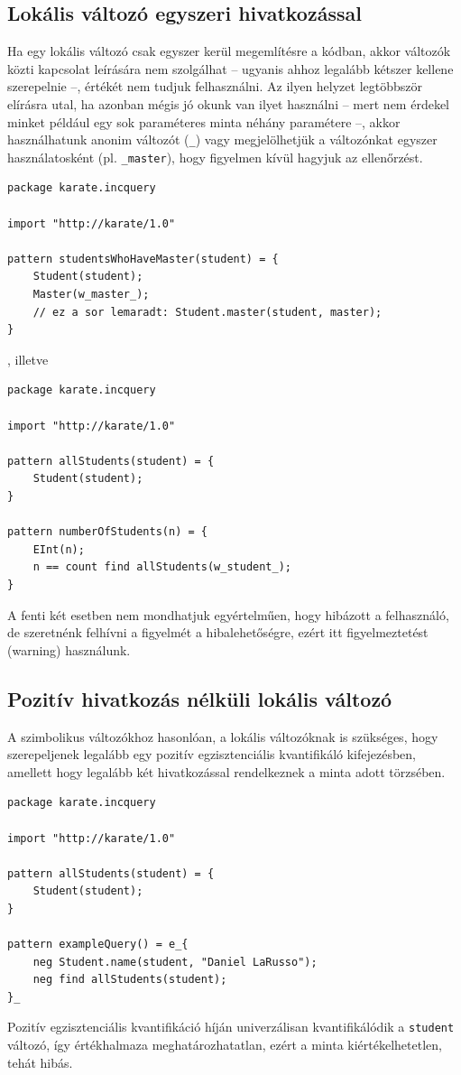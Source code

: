 \subsection{Lokális változó egyszeri hivatkozással}

Ha egy lokális változó csak egyszer kerül megemlítésre a kódban, akkor változók közti kapcsolat leírására nem szolgálhat -- ugyanis ahhoz legalább kétszer kellene szerepelnie --, értékét nem tudjuk felhasználni. Az ilyen helyzet legtöbbször elírásra utal, ha azonban mégis jó okunk van ilyet használni -- mert nem érdekel minket például egy sok paraméteres minta néhány paramétere --, akkor használhatunk anonim változót (\texttt{\_}) vagy megjelölhetjük a változónkat egyszer használatosként (pl. \texttt{\_master}), hogy figyelmen kívül hagyjuk az ellenőrzést.

\begin{lstlisting}
package karate.incquery

import "http://karate/1.0"

pattern studentsWhoHaveMaster(student) = {
    Student(student);
    Master(w_master_);
    // ez a sor lemaradt: Student.master(student, master);
}
\end{lstlisting}
%
%
, illetve
%
\begin{lstlisting}
package karate.incquery

import "http://karate/1.0"

pattern allStudents(student) = {
    Student(student);
}

pattern numberOfStudents(n) = {
    EInt(n);
    n == count find allStudents(w_student_);
}
\end{lstlisting}
%
%
A fenti két esetben nem mondhatjuk egyértelműen, hogy hibázott a felhasználó, de szeretnénk felhívni a figyelmét a hibalehetőségre, ezért itt figyelmeztetést (warning) használunk.

\subsection{Pozitív hivatkozás nélküli lokális változó}

A szimbolikus változókhoz hasonlóan, a lokális változóknak is szükséges, hogy szerepeljenek legalább egy pozitív egzisztenciális kvantifikáló kifejezésben, amellett hogy legalább két hivatkozással rendelkeznek a minta adott törzsében.
%
\begin{lstlisting}
package karate.incquery

import "http://karate/1.0"

pattern allStudents(student) = {
    Student(student);
}

pattern exampleQuery() = e_{
    neg Student.name(student, "Daniel LaRusso");
    neg find allStudents(student);
}_
\end{lstlisting}
%
Pozitív egzisztenciális kvantifikáció híján univerzálisan kvantifikálódik a \texttt{student} változó, így értékhalmaza meghatározhatatlan, ezért a minta kiértékelhetetlen, tehát hibás.

